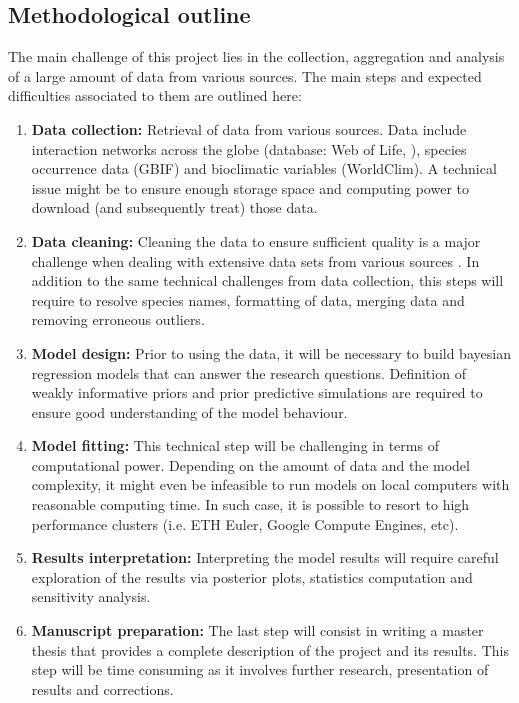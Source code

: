 \documentclass[12pt]{article}
\begin{document}
\subsection{Methodological outline}
The main challenge of this project lies in the collection, aggregation and analysis of a large amount of data from various sources. The main steps and expected difficulties associated to them are outlined here:
\begin{enumerate}
    \item \textbf{Data collection:} Retrieval of data from various sources. Data include interaction networks across the globe (database: Web of Life, \cite{Fortuna2014}), species occurrence data (GBIF) and bioclimatic variables (WorldClim). A technical issue might be to ensure enough storage space and computing power to download (and subsequently treat) those data.
    \item \textbf{Data cleaning:} Cleaning the data to ensure sufficient quality is a major challenge when dealing with extensive data sets from various sources \citep{Jetz2019}. In addition to the same technical challenges from data collection, this steps will require to resolve species names, formatting of data, merging data and removing erroneous outliers.
    \item \textbf{Model design:} Prior to using the data, it will be necessary to build bayesian regression models that can answer the research questions. Definition of weakly informative priors and prior predictive simulations are required to ensure good understanding of the model behaviour.
    \item \textbf{Model fitting:} This technical step will be challenging in terms of computational power. Depending on the amount of data and the model complexity, it might even be infeasible to run models on local computers with reasonable computing time. In such case, it is possible to resort to high performance clusters (i.e. ETH Euler, Google Compute Engines, etc).
    \item \textbf{Results interpretation:} Interpreting the model results will require careful exploration of the results via posterior plots, statistics computation and sensitivity analysis.
    \item \textbf{Manuscript preparation:} The last step will consist in writing a master thesis that provides a complete description of the project and its results. This step will be time consuming as it involves further research, presentation of results and corrections.
\end{enumerate}
\end{document}
